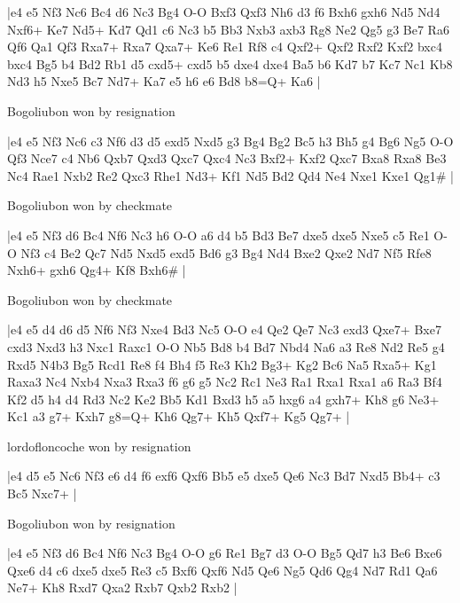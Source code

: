 \makegametitle
|e4 e5 Nf3 Nc6 Bc4 d6 Nc3 Bg4 O-O Bxf3 Qxf3 Nh6 d3 f6 Bxh6 gxh6 Nd5 Nd4 Nxf6+ Ke7 Nd5+ Kd7 Qd1 c6 Nc3 b5 Bb3 Nxb3 axb3 Rg8 Ne2 Qg5 g3 Be7 Ra6 Qf6 Qa1 Qf3 Rxa7+ Rxa7 Qxa7+ Ke6 Re1 Rf8 c4 Qxf2+ Qxf2 Rxf2 Kxf2 bxc4 bxc4 Bg5 b4 Bd2 Rb1 d5 cxd5+ cxd5 b5 dxe4 dxe4 Ba5 b6 Kd7 b7 Kc7 Nc1 Kb8 Nd3 h5 Nxe5 Bc7 Nd7+ Ka7 e5 h6 e6 Bd8 b8=Q+ Ka6  |

\showboard

Bogoliubon won by resignation

\makegametitle
|e4 e5 Nf3 Nc6 c3 Nf6 d3 d5 exd5 Nxd5 g3 Bg4 Bg2 Bc5 h3 Bh5 g4 Bg6 Ng5 O-O Qf3 Nce7 c4 Nb6 Qxb7 Qxd3 Qxc7 Qxc4 Nc3 Bxf2+ Kxf2 Qxc7 Bxa8 Rxa8 Be3 Nc4 Rae1 Nxb2 Re2 Qxc3 Rhe1 Nd3+ Kf1 Nd5 Bd2 Qd4 Ne4 Nxe1 Kxe1 Qg1\#  |

\showboard

Bogoliubon won by checkmate

\makegametitle
|e4 e5 Nf3 d6 Bc4 Nf6 Nc3 h6 O-O a6 d4 b5 Bd3 Be7 dxe5 dxe5 Nxe5 c5 Re1 O-O Nf3 c4 Be2 Qc7 Nd5 Nxd5 exd5 Bd6 g3 Bg4 Nd4 Bxe2 Qxe2 Nd7 Nf5 Rfe8 Nxh6+ gxh6 Qg4+ Kf8 Bxh6\#  |

\showboard

Bogoliubon won by checkmate

\makegametitle
|e4 e5 d4 d6 d5 Nf6 Nf3 Nxe4 Bd3 Nc5 O-O e4 Qe2 Qe7 Nc3 exd3 Qxe7+ Bxe7 cxd3 Nxd3 h3 Nxc1 Raxc1 O-O Nb5 Bd8 b4 Bd7 Nbd4 Na6 a3 Re8 Nd2 Re5 g4 Rxd5 N4b3 Bg5 Rcd1 Re8 f4 Bh4 f5 Re3 Kh2 Bg3+ Kg2 Bc6 Na5 Rxa5+ Kg1 Raxa3 Nc4 Nxb4 Nxa3 Rxa3 f6 g6 g5 Nc2 Rc1 Ne3 Ra1 Rxa1 Rxa1 a6 Ra3 Bf4 Kf2 d5 h4 d4 Rd3 Nc2 Ke2 Bb5 Kd1 Bxd3 h5 a5 hxg6 a4 gxh7+ Kh8 g6 Ne3+ Kc1 a3 g7+ Kxh7 g8=Q+ Kh6 Qg7+ Kh5 Qxf7+ Kg5 Qg7+  |

\showboard

lordofloncoche won by resignation

\makegametitle
|e4 d5 e5 Nc6 Nf3 e6 d4 f6 exf6 Qxf6 Bb5 e5 dxe5 Qe6 Nc3 Bd7 Nxd5 Bb4+ c3 Bc5 Nxc7+  |

\showboard

Bogoliubon won by resignation

\makegametitle
|e4 e5 Nf3 d6 Bc4 Nf6 Nc3 Bg4 O-O g6 Re1 Bg7 d3 O-O Bg5 Qd7 h3 Be6 Bxe6 Qxe6 d4 c6 dxe5 dxe5 Re3 c5 Bxf6 Qxf6 Nd5 Qe6 Ng5 Qd6 Qg4 Nd7 Rd1 Qa6 Ne7+ Kh8 Rxd7 Qxa2 Rxb7 Qxb2 Rxb2  |

